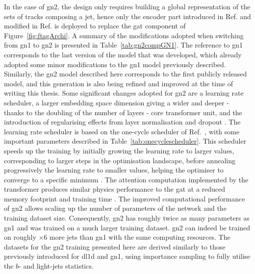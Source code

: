 In the case of \gls{gn2}, the design only requires building a global representation of the sets of tracks composing a jet, hence only the encoder part introduced in Ref. \cite{NIPS_transformerPaper} and modified in Ref. \cite{shleifer2021normformer} is deployed to replace the \gls{gat} component of Figure~\ref{fig:ftagArchi}. A summary of the modifications adopted when switching from \gls{gn1} to \gls{gn2} is presented in Table~\ref{tab:gn2compGN1}. The reference to \gls{gn1} corresponds to the last version of the model that was developed, which already adopted some minor modifications to the \gls{gn1} model previously described. Similarly, the \gls{gn2} model described here corresponds to the first publicly released model, and this generation is also being refined and improved at the time of writing this thesis. Some significant changes adopted for \gls{gn2} are a learning rate scheduler, a larger embedding space dimension giving a wider and deeper - thanks to the doubling of the number of layers - core transformer unit, and the introduction of regularising effects from layer normalisation and dropout \cite{ba2016layer}. The learning rate scheduler is based on the one-cycle scheduler of Ref.~\cite{smith2018disciplined}, with some important parameters described in Table~\ref{tab:onecyclescheduler}. This scheduler speeds up the training by initially growing the learning rate to larger values, corresponding to larger steps in the optimisation landscape, before annealing progressively the learning rate to smaller values, helping the optimiser to converge to a specific minimum \cite{smith2018superconvergence}. The attention computation implemented by the transformer produces similar physics performance to the \gls{gat} at a reduced memory footprint and training time \cite{duperrin2023flavour}. The improved computational performance of \gls{gn2} allows scaling up the number of parameters of the network and the training dataset size. Consequently, \gls{gn2} has roughly twice as many parameters as \gls{gn1} and was trained on a much larger training dataset. \gls{gn2} can indeed be trained on roughly $\times 6$ more jets than \gls{gn1} with the same computing resources. The datasets for the \gls{gn2} training presented here are derived similarly to those previously introduced for \gls{dl1d} and \gls{gn1}, using importance sampling to fully utilise the $b$- and light-jets statistics. 


